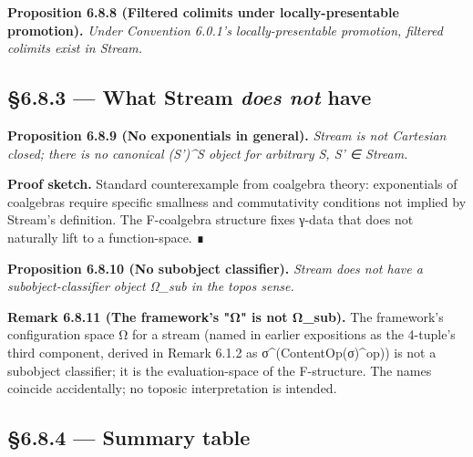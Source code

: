 \documentclass[11pt, openany]{book}
\begin{document}
\textbf{Proposition 6.8.8 (Filtered colimits under locally-presentable promotion).} \textit{Under Convention 6.0.1's locally-presentable promotion, filtered colimits exist in Stream.}

\subsection{§6.8.3 --- What Stream \textit{does not} have}

\textbf{Proposition 6.8.9 (No exponentials in general).} \textit{Stream is not Cartesian closed; there is no canonical (S')\textasciicircum{}S object for arbitrary S, S' ∈ Stream.}

\textbf{Proof sketch.} Standard counterexample from coalgebra theory: exponentials of coalgebras require specific smallness and commutativity conditions not implied by Stream's definition. The F-coalgebra structure fixes γ-data that does not naturally lift to a function-space. ∎

\textbf{Proposition 6.8.10 (No subobject classifier).} \textit{Stream does not have a subobject-classifier object Ω\_\allowbreak{}sub in the topos sense.}

\textbf{Remark 6.8.11 (The framework's "Ω" is not Ω\_\allowbreak{}sub).} The framework's configuration space Ω for a stream (named in earlier expositions as the 4-tuple's third component, derived in Remark 6.1.2 as σ\textasciicircum{}(ContentOp(σ)\textasciicircum{}op)) is not a subobject classifier; it is the evaluation-space of the F-structure. The names coincide accidentally; no toposic interpretation is intended.

\subsection{§6.8.4 --- Summary table}
\end{document}
